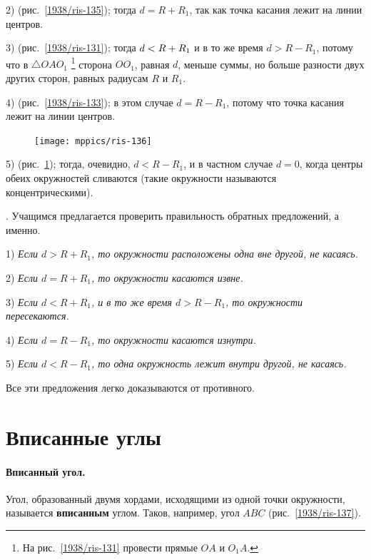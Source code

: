 \documentclass[oneside]{book}
\begin{document}
2)  (рис.~\ref{1938/ris-135});
тогда $d=R+R_1$, так как точка касания лежит на линии центров.

3)  (рис.~\ref{1938/ris-131});
тогда $d\z<R+R_1$ и в то же время $d>R-R_1$, потому что в $\triangle OAO_1$%
\footnote{На рис.~\ref{1938/ris-131} провести прямые $OA$ и $O_1A$.}
сторона $OO_1$, равная $d$, меньше суммы, но больше разности двух других сторон, равных радиусам $R$ и $R_1$.

4)  (рис.~\ref{1938/ris-133});
в этом случае $d=R-R_1$, потому что точка касания лежит на линии центров.

\begin{figure}
\centering
\texttt{[image: mppics/ris-136]}
\caption{}\label{1938/ris-136}
\end{figure}

5)  (рис.~\ref{1938/ris-136});
тогда, очевидно, $d<R-R_1$, и в частном случае $d= 0$, когда центры обеих окружностей сливаются (такие окружности называются концентрическими). %

\mbox{.}
Учащимся предлагается проверить правильность обратных предложений, а именно.

1) \emph{Если $d>R+R_1$, то окружности расположены одна вне другой, не касаясь.}

2) \emph{Если $d=R+R_1$, то окружности касаются извне.}

3) \emph{Если $d<R+R_1$, и в то же время $d>R-R_1$, то окружности пересекаются.} %

4) \emph{Если $d=R-R_1$, то окружности касаются изнутри.}

5) \emph{Если $d<R-R_1$, то одна окружность лежит внутри другой, не касаясь.}

Все эти предложения легко доказываются от противного.


\section{Вписанные углы}

\paragraph{Вписанный угол.}\label{1938/123}
Угол, образованный двумя хордами, исходящими из одной точки окружности, называется \textbf{вписанным} углом.
Таков, например, угол $ABC$ (рис.~\ref{1938/ris-137}).
\end{document}
